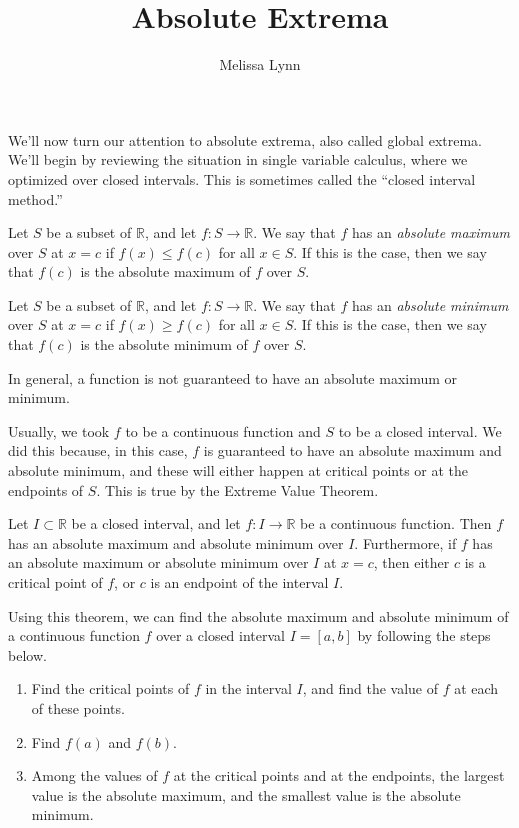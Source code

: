 \documentclass{ximera}
\title{Absolute Extrema}
\author{Melissa Lynn}
\begin{document}
\begin{abstract}
\end{abstract}
\maketitle

We'll now turn our attention to absolute extrema, also called global extrema. We'll begin by reviewing the situation in single variable calculus, where we optimized over closed intervals. This is sometimes called the ``closed interval method.''

\begin{definition}
Let $S$ be a subset of $\mathbb{R}$, and let $f:S\rightarrow\mathbb{R}$. We say that $f$ has an \emph{absolute maximum} over $S$ at $x=c$ if $f(x)\leq f(c)$ for all $x\in S$. If this is the case, then we say that $f(c)$ is the absolute maximum of $f$ over $S$.

Let $S$ be a subset of $\mathbb{R}$, and let $f:S\rightarrow\mathbb{R}$. We say that $f$ has an \emph{absolute minimum} over $S$ at $x=c$ if $f(x)\geq f(c)$ for all $x\in S$. If this is the case, then we say that $f(c)$ is the absolute minimum of $f$ over $S$.
\end{definition}

In general, a function is not guaranteed to have an absolute maximum or minimum. 

Usually, we took $f$ to be a continuous function and $S$ to be a closed interval. We did this because, in this case, $f$ is guaranteed to have an absolute maximum and absolute minimum, and these will either happen at critical points or at the endpoints of $S$. This is true by the Extreme Value Theorem.

\begin{theorem}
Let $I\subset \mathbb{R}$ be a closed interval, and let $f:I\rightarrow\mathbb{R}$ be a continuous function. Then $f$ has an absolute maximum and absolute minimum over $I$. Furthermore, if $f$ has an absolute maximum or absolute minimum over $I$ at $x=c$, then either $c$ is a critical point of $f$, or $c$ is an endpoint of the interval $I$.
\end{theorem}

Using this theorem, we can find the absolute maximum and absolute minimum of a continuous function $f$ over a closed interval $I=[a,b]$ by following the steps below.
\begin{enumerate}
\item Find the critical points of $f$ in the interval $I$, and find the value of $f$ at each of these points.
\item Find $f(a)$ and $f(b)$.
\item Among the values of $f$ at the critical points and at the endpoints, the largest value is the absolute maximum, and the smallest value is the absolute minimum.
\end{enumerate}
\end{document}
